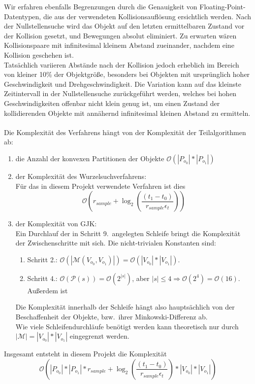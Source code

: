 Wir erfahren ebenfalls Begrenzungen durch die Genauigkeit von Floating-Point-Datentypen, die aus der verwendeten Kollisionsauflösung ersichtlich werden. Nach der Nullstellensuche wird das Objekt auf den letzten ermittelbaren Zustand vor der Kollision gesetzt, und Bewegungen absolut eliminiert. Zu erwarten wären Kollisionspaare mit infinitesimal kleinem Abstand zueinander, nachdem eine Kollision geschehen ist.\\
Tatsächlich variieren Abstände nach der Kollision jedoch erheblich im Bereich von kleiner 10\% der Objektgröße, besonders bei Objekten mit ursprünglich hoher Geschwindigkeit und Drehgeschwindigkeit. Die Variation kann auf das kleinste Zeitintervall in der Nullstellensuche zurückgeführt werden, welches bei hohen Geschwindigkeiten  offenbar nicht klein genug ist, um einen Zustand der kollidierenden Objekte mit annähernd infinitesimal kleinen Abstand zu ermitteln.\\
\\
Die Komplexität des Verfahrens hängt von der Komplexität der Teilalgorithmen ab:
\begin{enumerate}
\item die Anzahl der konvexen Partitionen der Objekte $\mathcal{O}(|P_{o_0}|*|P_{o_1}|)$
\item der Komplexität des Wurzelsuchverfahrens:\\
 Für das in diesem Projekt verwendete Verfahren ist dies $$\mathcal{O}(r_{sample} + \log_{2}(\frac{(t_1 - t_0)}{r_{sample}\epsilon_t} ))$$
\item der Komplexität von GJK:\\
Ein Durchlauf der in Schritt 9.~angelegten Schleife bringt die Komplexität der Zwischenschritte mit sich. Die nicht-trivialen Konstanten sind:
\begin{enumerate}
\item Schritt 2.: $\mathcal{O}(|\mathcal{M}(V_{o_0}, V_{o_1})|) = \mathcal{O}(|V_{o_0}|*|V_{o_1}|)$.

\item Schritt 4.: $\mathcal{O}(\mathcal{P}(s)) = \mathcal{O}(2^{|s|})$, aber $|s| \leq 4 \Rightarrow \mathcal{O}(2^4) = \mathcal{O}(16)$. Außerdem ist 
\end{enumerate}
Die Komplexität innerhalb der Schleife hängt also hauptsächlich von der Beschaffenheit der Objekte, bzw.~ihrer Minkowski-Differenz ab.\\
Wie viele Schleifendurchläufe benötigt werden kann theoretisch nur durch $|\mathcal{M}| = |V_{o_0}|*|V_{o_1}|$ eingegrenzt werden.
\end{enumerate}
Insgesamt entsteht in diesem Projekt die Komplexität 
$$\mathcal{O}(|P_{o_0}|*|P_{o_1}| * r_{sample} + \log_{2}(\frac{(t_1 - t_0)}{r_{sample}\epsilon_t}) * |V_{o_0}|*|V_{o_1}| )$$


